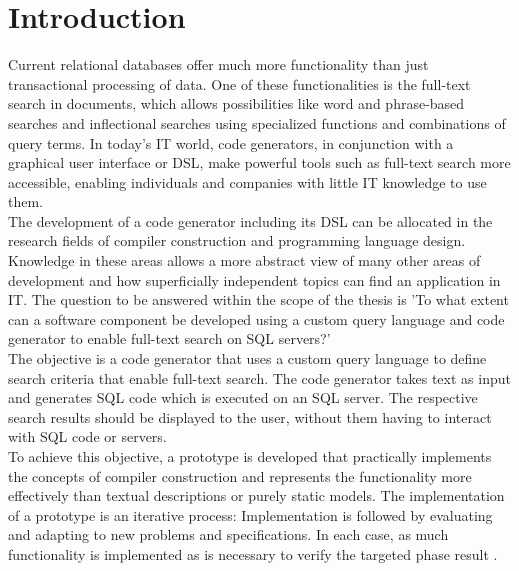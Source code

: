 \section{Introduction}
Current relational databases offer much more functionality than just transactional processing of data. One of these functionalities is the full-text search in documents, which allows possibilities like word and phrase-based searches and inflectional searches using specialized functions and combinations of query terms. In today's IT world, code generators, in conjunction with a graphical user interface or \ac{DSL}, make powerful tools such as full-text search more accessible, enabling individuals and companies with little IT knowledge to use them.\\
The development of a code generator including its \ac{DSL} can be allocated in the research fields of compiler construction and programming language design. Knowledge in these areas allows a more abstract view of many other areas of development and how superficially independent topics can find an application in IT. The question to be answered within the scope of the thesis is 'To what extent can a software component be developed using a custom query language and code generator to enable full-text search on \ac{SQL} servers?'\\
The objective is a code generator that uses a custom query language to define search criteria that enable full-text search. The code generator takes text as input and generates \ac{SQL} code which is executed on an \ac{SQL} server. The respective search results should be displayed to the user, without them having to interact with \ac{SQL} code or servers.\\
To achieve this objective, a prototype is developed that practically implements the concepts of compiler construction and represents the functionality more effectively than textual descriptions or purely static models. The implementation of a prototype is an iterative process: Implementation is followed by evaluating and adapting to new problems and specifications. In each case, as much functionality is implemented as is necessary to verify the targeted phase result \parencite[cf.][p. 3]{pomberger_methoden_1992}.